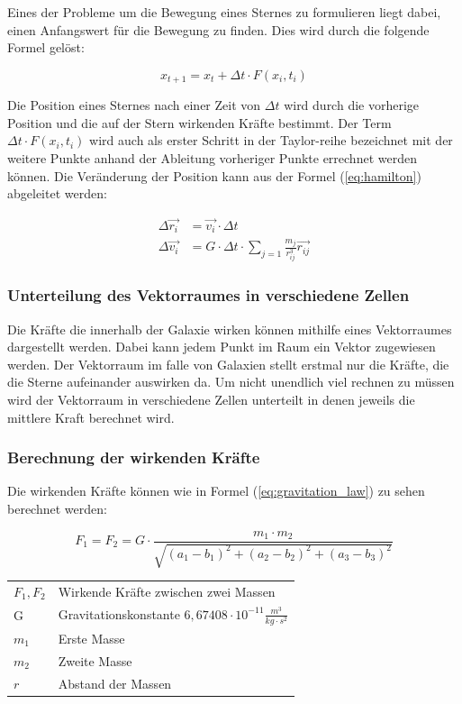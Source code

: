 Eines der Probleme um die Bewegung eines Sternes zu formulieren liegt dabei,
einen Anfangswert für die Bewegung zu finden. Dies wird durch die folgende
Formel gelöst:

\begin{equation}
  x_{t + 1} = x_{t} + \Delta t \cdot F(x_{i}, t_{i})
\end{equation}

Die Position eines Sternes nach einer Zeit von \( \Delta t \) wird durch die
vorherige Position und die auf der Stern wirkenden Kräfte bestimmt.
Der Term \( \Delta t \cdot F(x_{i}, t_{i}) \) wird auch als erster Schritt in
der Taylor-reihe bezeichnet mit der weitere Punkte anhand der Ableitung
vorheriger Punkte errechnet werden können.
Die Veränderung der Position kann aus der Formel (\ref{eq:hamilton}) abgeleitet
werden:

\begin{align}
  \Delta \vec{r_{i}} &=
  \vec{v_{i}} \cdot \Delta t \\
  \Delta \vec{v_{i}} &=
  G \cdot \Delta t \cdot \sum_{j = 1} \frac{m_{j}}{r^{3}_{ij}} \vec{r_{ij}}
\end{align}

\subsubsection{Unterteilung des Vektorraumes in verschiedene Zellen}
Die Kräfte die innerhalb der Galaxie wirken können mithilfe eines Vektorraumes
dargestellt werden. Dabei kann jedem Punkt im Raum ein Vektor zugewiesen werden.
Der Vektorraum im falle von Galaxien stellt erstmal nur die Kräfte, die die
Sterne aufeinander auswirken da.
Um nicht unendlich viel rechnen zu müssen wird der Vektorraum in verschiedene
Zellen unterteilt in denen jeweils die mittlere Kraft berechnet wird.

\subsubsection{Berechnung der wirkenden Kräfte}
Die wirkenden Kräfte können wie in Formel (\ref{eq:gravitation_law}) zu sehen
berechnet werden:

\begin{equation}\label{eq:gravitation_law}
  F_{1} = F_{2} = G \cdot \frac{m_{1} \cdot m_{2}}
  {\sqrt{(a_1 - b_1)^2 + (a_2 - b_2)^2 + (a_3 - b_3)^2}}
\end{equation}

\begin{tabular}{l l}
\( F_1 , F_2 \) & Wirkende Kräfte zwischen zwei Massen \\
G & Gravitationskonstante \( 6,67408 \cdot 10^{-11} \frac{m^3}{kg \cdot s^2} \) \\
\( m_1 \) & Erste Masse \\
\( m_2 \) & Zweite Masse \\
\( r \) & Abstand der Massen
\end{tabular}

